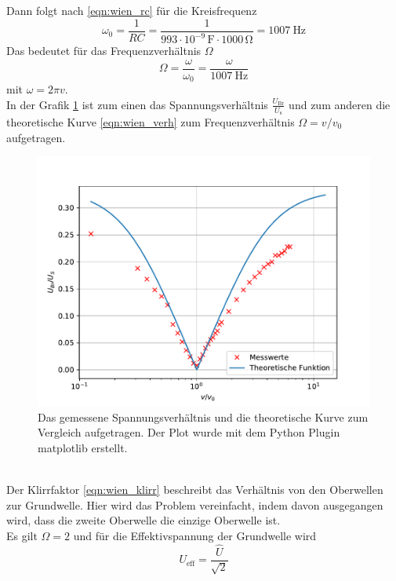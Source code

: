 Dann folgt nach \eqref{eqn:wien_rc} für die Kreisfrequenz
\begin{equation*}
  \omega_0 = \frac{1}{RC} = \frac{1}{993 \cdot 10^{-9}\, \si{\farad} \cdot 1000\, \si{\ohm}} = \SI{1007}{\hertz} 
\end{equation*}
Das bedeutet für das Frequenzverhältnis $\Omega$
\begin{equation*}
  \Omega = \frac{\omega}{\omega_0} = \frac{\omega}{\SI{1007}{\hertz}}
\end{equation*}
mit $\omega=2\pi v$.\\
In der Grafik \ref{fig:plot} ist zum einen das Spannungsverhältnis $\frac{U_\text{Br}}{U_\text{s}}$
und zum anderen die theoretische Kurve \eqref{eqn:wien_verh} zum Frequenzverhältnis $\Omega = v/v_0$ aufgetragen.
\begin{figure}
  \centering
  \includegraphics[width=\textwidth]{content/plot_e.pdf}
  \caption{Das gemessene Spannungsverhältnis und die theoretische Kurve zum Vergleich aufgetragen. Der Plot wurde mit dem Python Plugin matplotlib \cite{matplotlib} erstellt.}
  \label{fig:plot}
\end{figure}
\\
Der Klirrfaktor \eqref{eqn:wien_klirr} beschreibt das Verhältnis von den
Oberwellen zur Grundwelle. Hier wird das Problem vereinfacht, indem davon ausgegangen wird, dass
die zweite Oberwelle die einzige Oberwelle ist.\\
Es gilt $\Omega = 2$ und für die Effektivspannung der Grundwelle wird
\begin{equation*}
  U_\text{eff} = \frac{\hat{U}}{\sqrt{2}}
\end{equation*}
